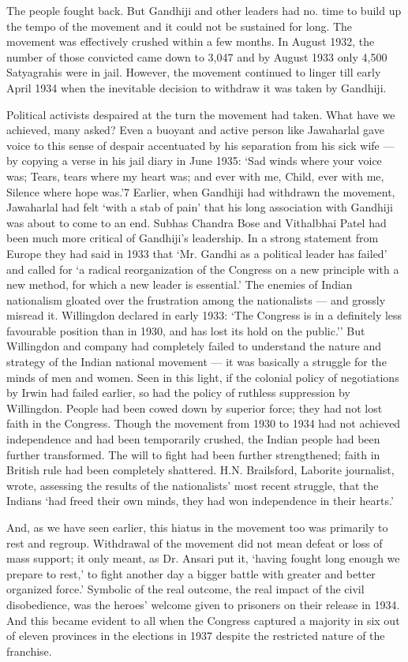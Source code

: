 The people fought back. But Gandhiji and other leaders had no. time to build up the tempo of the movement and it could not be sustained for long. The movement was effectively crushed within a few months. In August 1932, the number of those convicted came down to 3,047 and by August 1933 only 4,500 Satyagrahis were in jail. However, the movement continued to linger till early April 1934 when the inevitable decision to withdraw it was taken by Gandhiji. 

Political activists despaired at the turn the movement had taken. What have we achieved, many asked? Even a buoyant and active person like Jawaharlal gave voice to this sense of despair accentuated by his separation from his sick wife — by copying a verse in his jail diary in June 1935: `Sad winds where your voice was; Tears, tears where my heart was; and ever with me, Child, ever with me, Silence where hope was.'7 Earlier, when Gandhiji had withdrawn the movement, Jawaharlal had felt `with a stab of pain' that his long association with Gandhiji was about to come to an end. Subhas Chandra Bose and Vithalbhai Patel had been much more critical of Gandhiji's leadership. In a strong statement from Europe they had said in 1933 that `Mr. Gandhi as a political leader has failed' and called for `a radical reorganization of the Congress on a new principle with a new method, for which a new leader is essential.' The enemies of Indian nationalism gloated over the frustration among the nationalists — and grossly misread it. Willingdon declared in early 1933: `The Congress is in a definitely less favourable position than in 1930, and has lost its hold on the public.'' But Willingdon and company had completely failed to understand the nature and strategy of the Indian national movement — it was basically a struggle for the minds of men and women. Seen in this light, if the colonial policy of negotiations by Irwin had failed earlier, so had the policy of ruthless suppression by Willingdon. People had been cowed down by superior force; they had not lost faith in the Congress. Though the movement from 1930 to 1934 had not achieved independence and had been temporarily crushed, the Indian people had been further transformed. The will to fight had been further strengthened; faith in British rule had been completely shattered. H.N. Brailsford, Laborite journalist, wrote, assessing the results of the nationalists' most recent struggle, that the Indians `had freed their own minds, they had won independence in their hearts.' 

And, as we have seen earlier, this hiatus in the movement too was primarily to rest and regroup. Withdrawal of the movement did not mean defeat or loss of mass support; it only meant, as Dr. Ansari put it, `having fought long enough we prepare to rest,' to fight another day a bigger battle with greater and better organized force.' Symbolic of the real outcome, the real impact of the civil disobedience, was the heroes' welcome given to prisoners on their release in 1934. And this became evident to all when the Congress captured a majority in six out of eleven provinces in the elections in 1937 despite the restricted nature of the franchise. 

